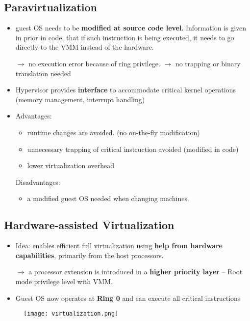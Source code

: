 \subsection{Paravirtualization}
\begin{itemize}
	\item guest OS needs to be \textbf{modified at source code level}. Information is given in prior in code, that if such instruction is being executed, it needs to go directly to the VMM instead of the hardware. 
	
	$\rightarrow$ no execution error because of ring privilege. $\rightarrow$ no trapping or binary translation needed 
	
	\item Hypervisor provides \textbf{interface} to accommodate critical kernel operations (memory management, interrupt handling)
	\item Advantages:
	\begin{itemize}
		\item runtime changes are avoided. (no on-the-fly modification)
		\item unnecessary trapping of critical instruction avoided (modified in code)
		\item lower virtualization overhead
	\end{itemize}
	Disadvantages:
	\begin{itemize}
		\item a modified guest OS needed when changing machines.
	\end{itemize}
	
\end{itemize}

\subsection{Hardware-assisted Virtualization}
\begin{itemize}
	\item Idea: enables efficient full virtualization using \textbf{help from hardware capabilities}, primarily from the host processors. 
	
	$\rightarrow$ a processor extension is introduced in a \textbf{higher priority layer} -- Root mode privilege level with VMM.
	
	\item Guest OS now operates at \textbf{Ring 0} and can execute all critical instructions
\end{itemize}

\begin{figure}[H]
	\centering
	\texttt{[image: virtualization.png]}
\end{figure}

